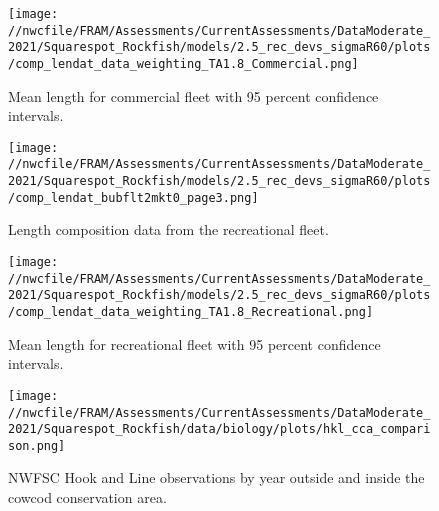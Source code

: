 \documentclass[11pt,
  english,
  a4paper,
]{article}
\begin{document}
\begin{figure}
\centering
\texttt{[image: //nwcfile/FRAM/Assessments/CurrentAssessments/DataModerate\_2021/Squarespot\_Rockfish/models/2.5\_rec\_devs\_sigmaR60/plots/comp\_lendat\_data\_weighting\_TA1.8\_Commercial.png]}
\caption{Mean length for commercial fleet with 95 percent confidence intervals.\label{fig:com-mean-len-data}}
\end{figure}

\tagmcend\tagstructend


\begin{figure}
\centering
\texttt{[image: //nwcfile/FRAM/Assessments/CurrentAssessments/DataModerate\_2021/Squarespot\_Rockfish/models/2.5\_rec\_devs\_sigmaR60/plots/comp\_lendat\_bubflt2mkt0\_page3.png]}
\caption{Length composition data from the recreational fleet.\label{fig:rec-len-data}}
\end{figure}

\tagmcend\tagstructend


\begin{figure}
\centering
\texttt{[image: //nwcfile/FRAM/Assessments/CurrentAssessments/DataModerate\_2021/Squarespot\_Rockfish/models/2.5\_rec\_devs\_sigmaR60/plots/comp\_lendat\_data\_weighting\_TA1.8\_Recreational.png]}
\caption{Mean length for recreational fleet with 95 percent confidence intervals.\label{fig:rec-mean-len-data}}
\end{figure}

\tagmcend\tagstructend


\begin{figure}
\centering
\texttt{[image: //nwcfile/FRAM/Assessments/CurrentAssessments/DataModerate\_2021/Squarespot\_Rockfish/data/biology/plots/hkl\_cca\_comparison.png]}
\caption{NWFSC Hook and Line observations by year outside and inside the cowcod conservation area.\label{fig:hkl-cca}}
\end{figure}
\end{document}
